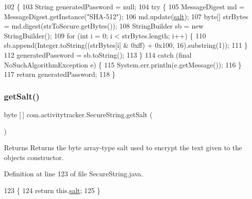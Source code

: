\begin{DoxyCode}
102                                                                                      \{
103         String generatedPassword = null;
104         \textcolor{keywordflow}{try} \{
105             MessageDigest md = MessageDigest.getInstance(\textcolor{stringliteral}{"SHA-512"});
106             md.update(\mbox{\hyperlink{classcom_1_1activitytracker_1_1_secure_string_a8549ead1f186ff0c2520818b03d1cc21}{salt}});
107             byte[] strBytes = md.digest(strToSecure.getBytes());
108             StringBuilder sb = \textcolor{keyword}{new} StringBuilder();
109             \textcolor{keywordflow}{for} (\textcolor{keywordtype}{int} i = 0; i < strBytes.length; i++) \{
110                 sb.append(Integer.toString((strBytes[i] & 0xff) + 0x100, 16).substring(1));
111             \}
112             generatedPassword = sb.toString();
113         \}
114         \textcolor{keywordflow}{catch} (\textcolor{keyword}{final} NoSuchAlgorithmException e) \{
115             System.err.println(e.getMessage());
116         \}
117         \textcolor{keywordflow}{return} generatedPassword;
118     \}
\end{DoxyCode}
\mbox{\label{classcom_1_1activitytracker_1_1_secure_string_ab5369653852da122aba874f35cbda9a5}} 
\subsubsection{\texorpdfstring{get\+Salt()}{getSalt()}}
{\footnotesize\ttfamily byte \mbox{[}$\,$\mbox{]} com.\+activitytracker.\+Secure\+String.\+get\+Salt (\begin{DoxyParamCaption}{ }\end{DoxyParamCaption})}

\begin{DoxyReturn}{Returns}
Returns the byte array-\/type salt used to encrypt the text given to the object\textquotesingle{}s constructor. 
\end{DoxyReturn}


Definition at line 123 of file Secure\+String.\+java.


\begin{DoxyCode}
123                             \{
124         \textcolor{keywordflow}{return} this.\mbox{\hyperlink{classcom_1_1activitytracker_1_1_secure_string_a8549ead1f186ff0c2520818b03d1cc21}{salt}};
125     \}
\end{DoxyCode}
\mbox{\label{classcom_1_1activitytracker_1_1_secure_string_aef531e12618c5c147adc52fda0d4add8}} 
